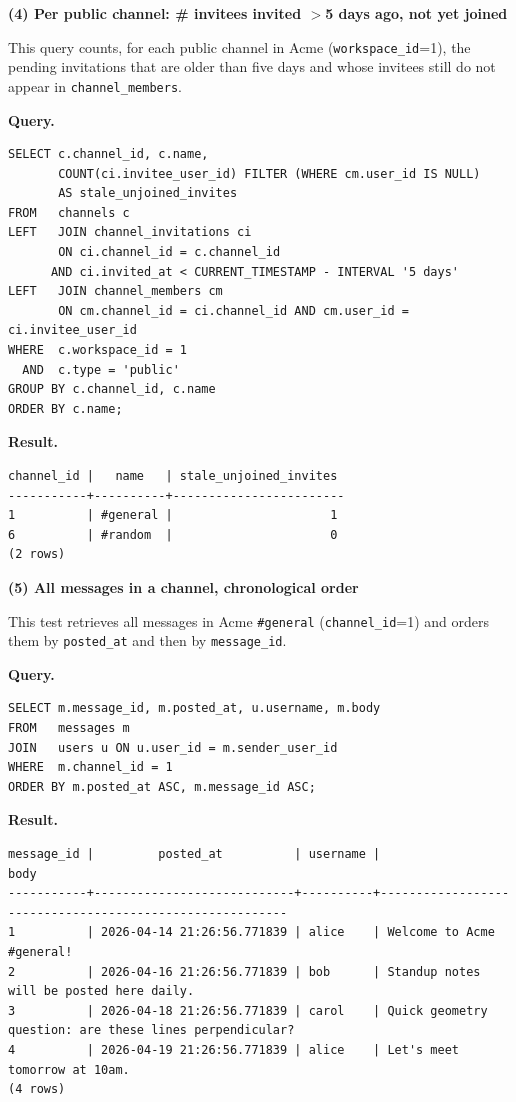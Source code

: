 \documentclass[11pt,letterpaper]{article}
\begin{document}
\noindent\textbf{(4) Per public channel: \# invitees invited $>$5 days ago, not yet joined}

This query counts, for each public channel in Acme
(\texttt{workspace\_id}=1), the pending invitations that are older than five
days and whose invitees still do not appear in \texttt{channel\_members}.

\noindent\textbf{Query.}
\begin{lstlisting}
SELECT c.channel_id, c.name,
       COUNT(ci.invitee_user_id) FILTER (WHERE cm.user_id IS NULL)
       AS stale_unjoined_invites
FROM   channels c
LEFT   JOIN channel_invitations ci
       ON ci.channel_id = c.channel_id
      AND ci.invited_at < CURRENT_TIMESTAMP - INTERVAL '5 days'
LEFT   JOIN channel_members cm
       ON cm.channel_id = ci.channel_id AND cm.user_id = ci.invitee_user_id
WHERE  c.workspace_id = 1
  AND  c.type = 'public'
GROUP BY c.channel_id, c.name
ORDER BY c.name;
\end{lstlisting}

\noindent\textbf{Result.}
\begin{lstlisting}[style=result]
channel_id |   name   | stale_unjoined_invites
-----------+----------+------------------------
1          | #general |                      1
6          | #random  |                      0
(2 rows)
\end{lstlisting}

\noindent\textbf{(5) All messages in a channel, chronological order}

This test retrieves all messages in Acme \texttt{\#general}
(\texttt{channel\_id}=1) and orders them by \texttt{posted\_at} and then by
\texttt{message\_id}.

\noindent\textbf{Query.}
\begin{lstlisting}
SELECT m.message_id, m.posted_at, u.username, m.body
FROM   messages m
JOIN   users u ON u.user_id = m.sender_user_id
WHERE  m.channel_id = 1
ORDER BY m.posted_at ASC, m.message_id ASC;
\end{lstlisting}

\noindent\textbf{Result.}
\begin{lstlisting}[style=result]
message_id |         posted_at          | username |                          body
-----------+----------------------------+----------+---------------------------------------------------------
1          | 2026-04-14 21:26:56.771839 | alice    | Welcome to Acme #general!
2          | 2026-04-16 21:26:56.771839 | bob      | Standup notes will be posted here daily.
3          | 2026-04-18 21:26:56.771839 | carol    | Quick geometry question: are these lines perpendicular?
4          | 2026-04-19 21:26:56.771839 | alice    | Let's meet tomorrow at 10am.
(4 rows)
\end{lstlisting}
\end{document}
